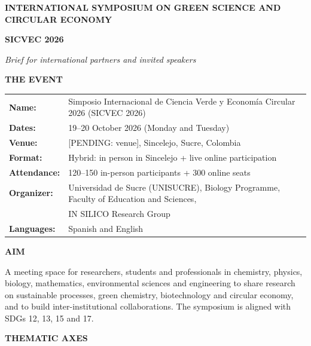 \documentclass[11pt,a4paper]{article}
\begin{document}
\vspace{0.3cm}

\begin{center}
\textbf{\Large INTERNATIONAL SYMPOSIUM ON GREEN SCIENCE AND CIRCULAR ECONOMY}

\textbf{\large SICVEC 2026}

\textit{Brief for international partners and invited speakers}
\end{center}

\vspace{0.3cm}

\noindent
\textbf{THE EVENT}

\begin{tabular}{ll}
\textbf{Name:} & Simposio Internacional de Ciencia Verde y Economía Circular 2026 (SICVEC 2026) \\
\textbf{Dates:} & 19--20 October 2026 (Monday and Tuesday) \\
\textbf{Venue:} & [PENDING: venue], Sincelejo, Sucre, Colombia \\
\textbf{Format:} & Hybrid: in person in Sincelejo + live online participation \\
\textbf{Attendance:} & 120--150 in-person participants + 300 online seats \\
\textbf{Organizer:} & Universidad de Sucre (UNISUCRE), Biology Programme, Faculty of Education and Sciences, \\
 & IN SILICO Research Group \\
\textbf{Languages:} & Spanish and English \\
\end{tabular}

\vspace{0.3cm}

\noindent
\textbf{AIM}

A meeting space for researchers, students and professionals in chemistry, physics, biology, mathematics,
environmental sciences and engineering to share research on sustainable processes, green chemistry,
biotechnology and circular economy, and to build inter-institutional collaborations. The symposium is
aligned with SDGs 12, 13, 15 and 17.

\vspace{0.3cm}

\noindent
\textbf{THEMATIC AXES}
\end{document}
